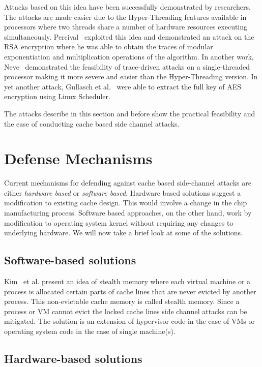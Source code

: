 \documentclass[onecolumn]{IEEEtran}
\begin{document}
Attacks based on this idea have been successfully demonstrated by researchers.  The attacks are made easier due to the Hyper-Threading features available in processors where two threads share a number of hardware resources executing simultaneously.  Percival~\cite{percival2005cache} exploited this idea and demonstrated an attack on the RSA encryption where he was able to obtain the traces of modular exponentiation and multiplication operations of the algorithm.  In another work, Neve~\cite{neve2006advances} demonstrated the feasibility of trace-driven attacks on a single-threaded processor making it more severe and easier than the Hyper-Threading version.  In yet another attack, Gullasch et al.~\cite{gullasch2011cache} were able to extract the full key of AES encryption using Linux Scheduler.  

The attacks describe in this section and before show the practical feasibility and the ease of conducting cache based side channel attacks.

\section{Defense Mechanisms}

Current mechanisms for defending against cache based side-channel attacks are either {\it hardware based} or {\it software based}.  Hardware based solutions suggest a modification to existing cache design.  This would involve a change in the chip manufacturing process.  Software based approaches, on the other hand, work by modification to operating system kernel without requiring any changes to underlying hardware.  We will now take a brief look at some of the solutions.

\subsection{Software-based solutions}

Kim~\cite{kim2012stealthmem} et al. present an idea of stealth memory where each virtual machine or a process is allocated certain parts of cache lines that are never evicted by another process.  This non-evictable cache memory is called stealth memory.  Since a process or VM cannot evict the locked cache lines side channel attacks can be mitigated.  The solution is an extension of hypervisor code in the case of VMs or operating system code in the case of single machine(s).

\subsection{Hardware-based solutions}
\end{document}
